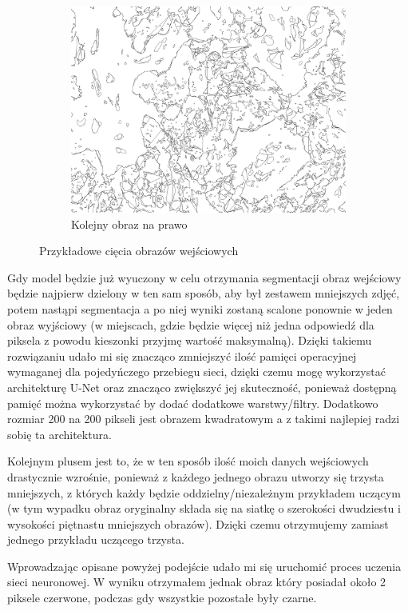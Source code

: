 \documentclass{article}
\begin{document}
\begin{figure}[H]
  \begin{subfigure}{0.4\linewidth}
    \includegraphics[width=\linewidth]{images/output.jpg}
    \caption{Kolejny obraz na prawo}
  \end{subfigure}
  \caption{Przykładowe cięcia obrazów wejściowych}
  \label{fig:input_split}
\end{figure}
Gdy model będzie już wyuczony w celu otrzymania segmentacji obraz wejściowy będzie najpierw dzielony w ten sam sposób, aby był zestawem mniejszych zdjęć, potem nastąpi segmentacja a po niej wyniki zostaną scalone ponownie w jeden obraz wyjściowy (w miejscach, gdzie będzie więcej niż jedna odpowiedź dla piksela z powodu kieszonki przyjmę wartość maksymalną).
Dzięki takiemu rozwiązaniu udało mi się znacząco zmniejszyć ilość pamięci operacyjnej wymaganej dla pojedyńczego przebiegu sieci, dzięki czemu mogę wykorzystać architekturę U-Net oraz znacząco zwiększyć jej skuteczność, ponieważ dostępną pamięć można wykorzystać by dodać dodatkowe warstwy/filtry.
Dodatkowo rozmiar 200 na 200 pikseli jest obrazem kwadratowym a z takimi najlepiej radzi sobię ta architektura.

Kolejnym plusem jest to, że w ten sposób ilość moich danych wejściowych drastycznie wzrośnie, ponieważ z każdego jednego obrazu utworzy się trzysta mniejszych, z których każdy będzie oddzielny/niezależnym przykładem uczącym (w tym wypadku obraz oryginalny składa się na siatkę o szerokości dwudziestu i wysokości piętnastu mniejszych obrazów).
Dzięki czemu otrzymujemy zamiast jednego przykładu uczącego trzysta.

Wprowadzając opisane powyżej podejście udało mi się uruchomić proces uczenia sieci neuronowej.
W wyniku otrzymałem jednak obraz który posiadał około 2 piksele czerwone, podczas gdy wszystkie pozostałe były czarne.
\end{document}

